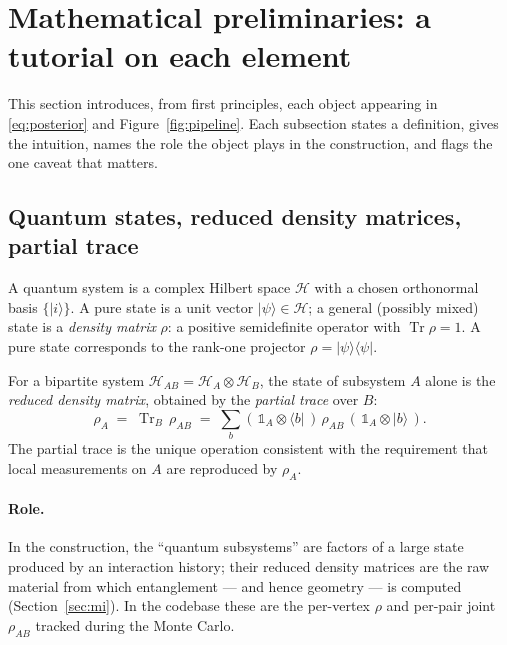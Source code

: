 \documentclass[11pt]{article}
\DeclareMathOperator{\Tr}{Tr}
\newcommand{\HH}{\mathcal{H}}
\newcommand{\ket}[1]{\lvert #1 \rangle}
\newcommand{\bra}[1]{\langle #1 \rvert}
\theoremstyle{definition}
\theoremstyle{plain}
\begin{document}
\section{Mathematical preliminaries: a tutorial on each element}
\label{sec:prelim}

This section introduces, from first principles, each object appearing in
\eqref{eq:posterior} and Figure~\ref{fig:pipeline}. Each subsection states a definition,
gives the intuition, names the role the object plays in the construction, and flags the one
caveat that matters.

\subsection{Quantum states, reduced density matrices, partial trace}
\label{sec:qstate}

A quantum system is a complex Hilbert space $\HH$ with a chosen orthonormal basis
$\{\ket{i}\}$. A pure state is a unit vector $\ket{\psi}\in\HH$; a general (possibly mixed)
state is a \emph{density matrix} $\rho$: a positive semidefinite operator with
$\Tr\rho=1$. A pure state corresponds to the rank-one projector $\rho=\ket{\psi}\bra{\psi}$.

For a bipartite system $\HH_{AB}=\HH_A\otimes\HH_B$, the state of subsystem $A$ alone is the
\emph{reduced density matrix}, obtained by the \emph{partial trace} over $B$:
\begin{equation}
\rho_A \;=\; \Tr_B\,\rho_{AB}
\;=\; \sum_{b} (\,\mathbb{1}_A\otimes\bra{b}\,)\,\rho_{AB}\,(\,\mathbb{1}_A\otimes\ket{b}\,).
\end{equation}
The partial trace is the unique operation consistent with the requirement that local
measurements on $A$ are reproduced by $\rho_A$.

\paragraph{Role.} In the construction, the ``quantum subsystems'' are factors of a large
state produced by an interaction history; their reduced density matrices are the raw
material from which entanglement --- and hence geometry --- is computed
(Section~\ref{sec:mi}). In the codebase these are the per-vertex $\rho$ and per-pair joint
$\rho_{AB}$ tracked during the Monte Carlo.

\end{document}
